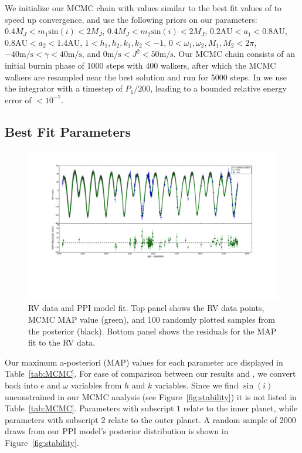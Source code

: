 We initialize our MCMC chain with values similar to the best fit values of \R to speed up convergence, and use the following priors on our parameters: $0.4M_J<m_1\textrm{sin}(i) < 2M_J$, $0.4M_J<m_2\textrm{sin}(i) < 2M_J$, $0.2 \textrm{AU}<a_1< 0.8\textrm{AU}$, $0.8\textrm{AU}<a_2< 1.4\textrm{AU}$, $1<h_1, h_2, k_1, k_2<-1$, $0<\omega_1, \omega_2, M_1, M_2<2\pi$, $-40\textrm{m/s}<\gamma<40\textrm{m/s}$, and $0\textrm{m/s}<J^2<50\textrm{m/s}$.
Our MCMC chain consists of an initial burnin phase of 1000 steps with 400 walkers, after which the MCMC walkers are resampled near the best solution and run for 5000 steps.
In \reb we use the \whfast integrator \citep{Rein2015b} with a timestep of $P_1/200$, leading to a bounded relative energy error of $<10^{-7}$.


\subsection{Best Fit Parameters}
\label{sec:Results}
\begin{figure}
\includegraphics[trim=4.4cm 8cm 4.5cm 0cm, width=\textwidth]{chap6/images/hk_400walk_5000it_chkpt1_MAP_RV.pdf}
\caption{RV data and PPI model fit. 
Top panel shows the RV data points, MCMC MAP value (green), and 100 randomly plotted samples from the posterior (black). 
Bottom panel shows the residuals for the MAP fit to the RV data. 
 }
\label{fig:MCMC}
\end{figure}

Our maximum a-posteriori (MAP) values for each parameter are displayed in Table~\ref{tab:MCMC}. 
For ease of comparison between our results and \R, we convert back into $e$ and $\omega$ variables from $h$ and $k$ variables.
Since we find $\sin(i)$ unconstrained in our MCMC analysis (see Figure~\ref{fig:stability}) it is not listed in Table~\ref{tab:MCMC}.
Parameters with subscript $1$ relate to the inner planet, while parameters with subscript $2$ relate to the outer planet. 
A random sample of 2000 draws from our PPI model's posterior distribution is shown in Figure~\ref{fig:stability}.

